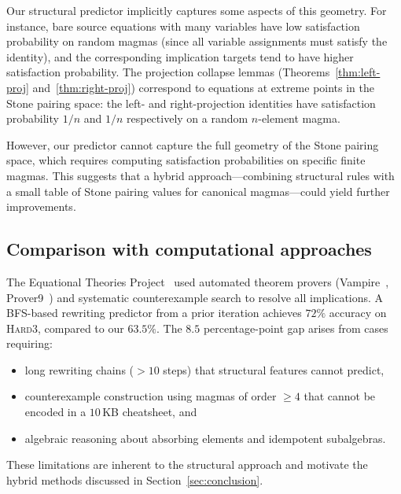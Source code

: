 Our structural predictor implicitly captures some aspects of
this geometry.  For instance, bare source equations with many
variables have low satisfaction probability on random magmas
(since all variable assignments must satisfy the identity),
and the corresponding implication targets tend to have higher
satisfaction probability.  The projection collapse lemmas
(Theorems~\ref{thm:left-proj} and~\ref{thm:right-proj})
correspond to equations at extreme points in the Stone pairing
space: the left- and right-projection identities have
satisfaction probability $1/n$ and $1/n$ respectively on a
random $n$-element magma.

However, our predictor cannot capture the full geometry of the
Stone pairing space, which requires computing satisfaction
probabilities on specific finite magmas.  This suggests that a
hybrid approach---combining structural rules with a small table
of Stone pairing values for canonical magmas---could yield
further improvements.

\subsection{Comparison with computational approaches}

The Equational Theories Project~\cite{bolan2025equational} used
automated theorem provers (Vampire~\cite{kovacs2013vampire},
Prover9~\cite{mccune2003prover9}) and systematic counterexample
search to resolve all implications.  A BFS-based rewriting predictor
from a prior iteration achieves $72\%$ accuracy on \textsc{Hard3},
compared to our $63.5\%$.  The $8.5$ percentage-point gap arises
from cases requiring:
\begin{itemize}[leftmargin=*,itemsep=2pt]
\item long rewriting chains ($>10$ steps) that structural features
  cannot predict,
\item counterexample construction using magmas of order $\geq 4$
  that cannot be encoded in a $10$\,KB cheatsheet, and
\item algebraic reasoning about absorbing elements and idempotent
  subalgebras.
\end{itemize}
These limitations are inherent to the structural approach and
motivate the hybrid methods discussed in Section~\ref{sec:conclusion}.
